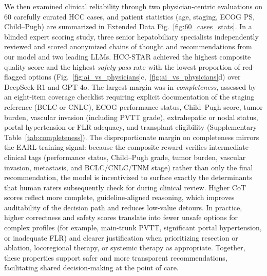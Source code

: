 \documentclass{article}
\begin{document}

We then examined clinical reliability through two physician-centric evaluations on 60 carefully curated HCC cases, and patient statistics (age, staging, ECOG PS, Child–Pugh) are summarized in Extended Data Fig.~\ref{fig:60_cases_stats}. In a blinded expert scoring study, three senior hepatobiliary specialists independently reviewed and scored anonymized chains of thought and recommendations from our model and two leading LLMs. {HCC-STAR} achieved the highest composite quality score and the highest \emph{safety-pass} rate with the lowest proportion of red-flagged options (Fig.~\ref{fig:ai_vs_physicians}c,~\ref{fig:ai_vs_physicians}d) over DeepSeek-R1 and GPT-4o. The largest margin was in \emph{completeness}, assessed by an eight-item coverage checklist requiring explicit documentation of the staging reference (BCLC or CNLC), ECOG performance status, Child–Pugh score, tumor burden, vascular invasion (including PVTT grade), extrahepatic or nodal status, portal hypertension or FLR adequacy, and transplant eligibility (Supplementary Table~\ref{tab:completeness}). The disproportionate margin on completeness mirrors the EARL training signal: because the composite reward verifies intermediate clinical tags (performance status, Child–Pugh grade, tumor burden, vascular invasion, metastasis, and BCLC/CNLC/TNM stage) rather than only the final recommendation, the model is incentivized to surface exactly the determinants that human raters subsequently check for during clinical review.
Higher CoT scores reflect more complete, guideline-aligned reasoning, which improves auditability of the decision path and reduces low-value detours. In practice, higher correctness and safety scores translate into fewer unsafe options for complex profiles (for example, main-trunk PVTT, significant portal hypertension, or inadequate FLR) and clearer justification when prioritizing resection or ablation, locoregional therapy, or systemic therapy as appropriate. Together, these properties support safer and more transparent recommendations, facilitating shared decision-making at the point of care.
\end{document}
